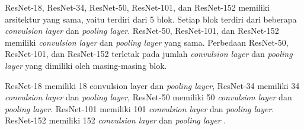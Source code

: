 ResNet-18, ResNet-34, ResNet-50, ResNet-101, dan ResNet-152 memiliki arsitektur yang sama, yaitu terdiri dari 5 blok. Setiap blok terdiri dari beberapa \emph{convulsion layer} dan \emph{pooling layer}. ResNet-50, ResNet-101, dan ResNet-152 memiliki \emph{convulsion layer} dan \emph{pooling layer} yang sama. Perbedaan ResNet-50, ResNet-101, dan ResNet-152 terletak pada jumlah \emph{convulsion layer} dan \emph{pooling layer} yang dimiliki oleh masing-masing blok.

ResNet-18 memiliki 18 convulsion layer dan \emph{pooling layer}, ResNet-34 memiliki 34 \emph{convulsion layer} dan \emph{pooling layer}, ResNet-50 memiliki 50 \emph{convulsion layer} dan \emph{pooling layer}. ResNet-101 memiliki 101 \emph{convulsion layer} dan \emph{pooling layer}. ResNet-152 memiliki 152 \emph{convulsion layer} dan \emph{pooling layer} \parencite{ResNet}.



